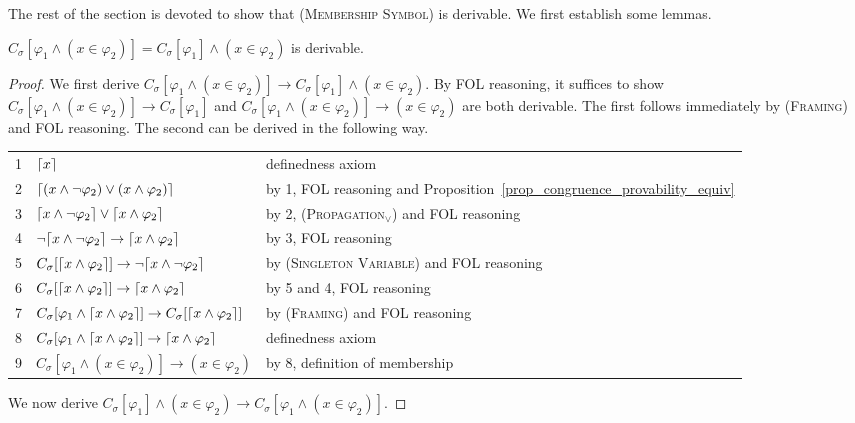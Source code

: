 \documentclass[acmsmall]{acmart}
\theoremstyle{acmdefinition}
\newcommand{\imp}{\to}
\newcommand{\CSub}[1]{C_{#1}}
\newcommand{\Csigmaapp}[1]{\CSub{\sigma}[#1]}
\newcommand{\prule}[1]{\textsc{(#1)}}
\newcommand{\singletonvariable}{\prule{Singleton Variable}\xspace}
\newcommand{\propagationvee}{\prule{Propagation$_\vee$}\xspace}
\newcommand{\framing}{\prule{Framing}\xspace}
\newcommand{\membershipsymbol}{\prule{Membership Symbol}\xspace}
\DeclarePairedDelimiter{\ceil}{\lceil}{\rceil}
\begin{document}
The rest of the section is devoted to show that
\membershipsymbol is derivable.
We first establish some lemmas.

\begin{lemma}
\label{lemma_propagate_membership_in_application}
$\Csigmaapp{\varphi_1 \wedge (x \in \varphi_2)}
 = \Csigmaapp{\varphi_1} \wedge (x \in \varphi_2)$ is derivable.
\end{lemma}

\begin{proof}
We first derive
$\Csigmaapp{\varphi_1 \wedge (x \in \varphi_2)}
 \imp \Csigmaapp{\varphi_1} \wedge (x \in \varphi_2)$.
By FOL reasoning, it suffices to show
$\Csigmaapp{\varphi_1 \wedge (x \in \varphi_2)}
 \imp \Csigmaapp{\varphi_1}$
and
$\Csigmaapp{\varphi_1 \wedge (x \in \varphi_2)}
 \imp (x \in \varphi_2)$
are both derivable.
The first follows immediately by \framing and FOL reasoning.
The second can be derived in the following way.
\begin{center}
\begin{tabular}{l|ll}
1 & $\ceil{x}$
  & definedness axiom \\
2 & $\ceil{(x \wedge \neg \varphi_2) \vee (x \wedge \varphi_2)}$
  & by 1, FOL reasoning and
    Proposition~\ref{prop_congruence_provability_equiv} \\
3 & $\ceil{x \wedge \neg \varphi_2} \vee \ceil{x \wedge \varphi_2}$
  & by 2, \propagationvee and FOL reasoning \\
4 & $\neg \ceil{x \wedge \neg \varphi_2}
          \imp \ceil{x \wedge \varphi_2}$
     & by 3, FOL reasoning \\
5 & $\Csigmaapp{\ceil{x \wedge \varphi_2}}
      \imp \neg \ceil{x \wedge \neg \varphi_2}$
  & by \singletonvariable and FOL reasoning \\
6 & $\Csigmaapp{\ceil{x \wedge \varphi_2}}
      \imp \ceil{x \wedge \varphi_2}$ 
  & by 5 and 4, FOL reasoning \\
7 & $\Csigmaapp{\varphi_1 \wedge \ceil{x \wedge \varphi_2}}
     \imp \Csigmaapp{\ceil{x \wedge \varphi_2}}$
  & by \framing and FOL reasoning \\
8 & $\Csigmaapp{\varphi_1 \wedge \ceil{x \wedge \varphi_2}}
     \imp \ceil{x \wedge \varphi_2}$ 
  & definedness axiom \\
9 & $\Csigmaapp{\varphi_1 \wedge (x \in \varphi_2)}
     \imp (x \in \varphi_2)$ 
  & by 8, definition of membership \\
\end{tabular}
\end{center}
We now derive 
$\Csigmaapp{\varphi_1} \wedge (x \in \varphi_2)
 \imp \Csigmaapp{\varphi_1 \wedge (x \in \varphi_2)}$.

\end{proof}
\end{document}
